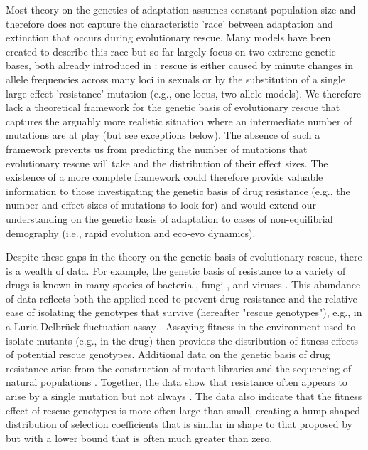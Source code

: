\documentclass[9pt,twocolumn,twoside,lineno]{gsajnl}
\begin{document}
Most theory on the genetics of adaptation \citep[reviewed in][]{Orr2005} assumes constant population size and therefore does not capture the characteristic 'race' between adaptation and extinction that occurs during evolutionary rescue. 
Many models have been created to describe this race \citep[reviewed in][]{Alexander2014} but so far largely focus on two extreme genetic bases, both already introduced in \cite{Gomulkiewicz1995}: 
rescue is either caused by minute changes in allele frequencies across many loci in sexuals \citep[i.e., the infinitesimal model;][]{Fisher1918} or by the substitution of a single large effect 'resistance' mutation (e.g., one locus, two allele models).
We therefore lack a theoretical framework for the genetic basis of evolutionary rescue that captures the arguably more realistic situation where an intermediate number of mutations are at play (but see exceptions below). 
The absence of such a framework prevents us from predicting the number of mutations that evolutionary rescue will take and the distribution of their effect sizes.
The existence of a more complete framework could therefore provide valuable information to those investigating the genetic basis of drug resistance (e.g., the number and effect sizes of mutations to look for) and would extend our understanding on the genetic basis of adaptation to cases of non-equilibrial demography (i.e., rapid evolution and eco-evo dynamics).

Despite these gaps in the theory on the genetic basis of evolutionary rescue, there is a wealth of data.
For example, the genetic basis of resistance to a variety of drugs is known in many species of bacteria \citep[reviewed in][]{MacLean2010}, fungi \citep[reviewed in][]{Robbins2017}, and viruses \citep[reviewed in][]{Yilmaz2016}.
This abundance of data reflects both the applied need to prevent drug resistance and the relative ease of isolating the genotypes that survive (hereafter "rescue genotypes"), e.g., in a Luria-Delbr\"{u}ck fluctuation assay \citep[reviewed in][]{Bataillon2014}.
Assaying fitness in the environment used to isolate mutants (e.g., in the drug) then provides the distribution of fitness effects of potential rescue genotypes. %
Additional data on the genetic basis of drug resistance arise from the construction of mutant libraries \citep[e.g.,][]{Weinreich2006} and the sequencing of natural populations \citep[e.g.,][]{Pennings2014}.
Together, the data show that resistance often appears to arise by a single mutation \citep[e.g.,][]{MacLean2009,Lindsey2013,Gerstein2012} but not always \citep[e.g.,][]{Bataillon2011,Pennings2014,Gerstein2015,williams2019drug}.
The data also indicate that the fitness effect of rescue genotypes is more often large than small, creating a hump-shaped distribution of selection coefficients \citep[e.g.,][]{Kassen2006,MacLean2009,Gerstein2012,Lindsey2013,Gerstein2015} that is similar in shape to that proposed by \cite{Kimura1983} but with a lower bound that is often much greater than zero.
\end{document}
